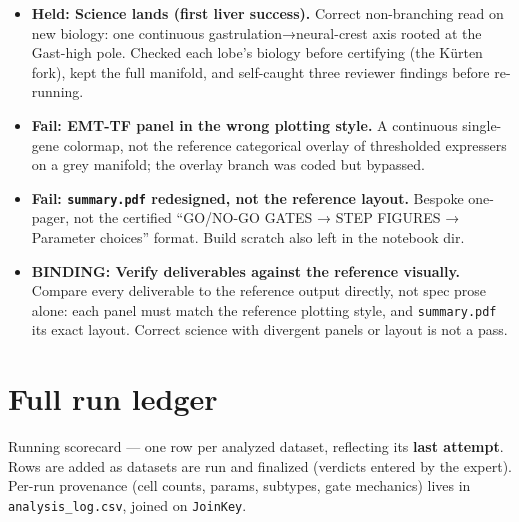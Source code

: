 \documentclass[11pt,a4paper]{article}
\providecommand{\tightlist}{\setlength{\itemsep}{0pt}\setlength{\parskip}{0pt}}
\begin{document}
\begin{itemize}
\tightlist
\item
  \textbf{Held: Science lands (first liver success).} Correct
  non-branching read on new biology: one continuous
  gastrulation→neural-crest axis rooted at the Gast-high pole. Checked
  each lobe's biology before certifying (the Kürten fork), kept the full
  manifold, and self-caught three reviewer findings before re-running.
\item
  \textbf{Fail: EMT-TF panel in the wrong plotting style.} A
  continuous single-gene colormap, not the reference categorical overlay
  of thresholded expressers on a grey manifold; the overlay branch was
  coded but bypassed.
\item
  \textbf{Fail: \texttt{summary.pdf} redesigned, not the reference
  layout.} Bespoke one-pager, not the certified ``GO/NO-GO GATES → STEP
  FIGURES → Parameter choices'' format. Build scratch also left in the
  notebook dir.
\item
  \textbf{BINDING: Verify deliverables against the reference
  visually.} Compare every deliverable to the reference output directly,
  not spec prose alone: each panel must match the reference plotting
  style, and \texttt{summary.pdf} its exact layout. Correct science with
  divergent panels or layout is not a pass.
\end{itemize}

\hypertarget{sec:5}{%
\section{Full run ledger}\label{sec:5}}

Running scorecard --- one row per analyzed dataset, reflecting its
\textbf{last attempt}. Rows are added as datasets are run and finalized
(verdicts entered by the expert). Per-run provenance (cell counts,
params, subtypes, gate mechanics) lives in \texttt{analysis\_log.csv},
joined on \texttt{JoinKey}.
\end{document}
